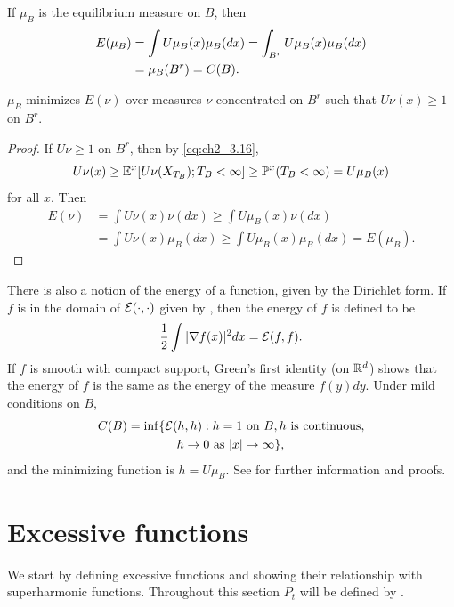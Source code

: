 If $\mu_B$ is the equilibrium measure on $B$, then
\begin{align}\label{eq:ch2_5.17}
    E(\mu_B) &= \int U\mu_B(x)\mu_B(dx) = \int_{B^r} U\mu_B(x)\mu_B(dx) \\
    &= \mu_B(B^r) = C(B). \notag
\end{align}

\begin{proposition}\label{prop:ch2_5.19}
$\mu_B$ minimizes $E(\nu)$ over measures $\nu$ concentrated on $B^r$ such that $U\nu(x) \geq 1$ on $B^r$.
\end{proposition}

\begin{proof}
If $U\nu \geq 1$ on $B^r$, then by \eqref{eq:ch2_3.16},
\[
    U\nu(x) \geq \mathbb{E}^x[U\nu(X_{T_B}); T_B < \infty] \geq \mathbb{P}^x(T_B < \infty) = U\mu_B(x)
\]
for all $x$. Then
\begin{align*}
    E(\nu) &= \int U\nu(x)\nu(dx) \geq \int U\mu_B(x)\nu(dx) \\
    &= \int U\nu(x)\mu_B(dx) \geq \int U\mu_B(x)\mu_B(dx) = E(\mu_B).
\end{align*}
\end{proof}

There is also a notion of the energy of a function, given by the Dirichlet form. If $f$ is in the domain of $\mathcal{E}(\cdot,\cdot)$ given by , then the energy of $f$ is defined to be
\[
    \frac{1}{2}\int|\nabla f(x)|^2dx = \mathcal{E}(f,f).
\]
If $f$ is smooth with compact support, Green's first identity (on $\mathbb{R}^d$) shows that the energy of $f$ is the same as the energy of the measure $f(y)dy$. Under mild conditions on $B$,
\begin{align}\label{eq:ch2_5.18}
    C(B) &= \inf\{\mathcal{E}(h,h) : h = 1~\text{on}~B, h~\text{is continuous}, \\
    &\qquad\qquad h \to 0~\text{as}~|x| \to \infty\}, \notag
\end{align}
and the minimizing function is $h = U\mu_B$. See \cite{Fukushima1980} for further information and proofs.

\mpagebreak

\section{Excessive functions}\label{ch2_sec6}


We start by defining excessive functions and showing their relationship with superharmonic functions. Throughout this section $P_t$ will be defined by .

